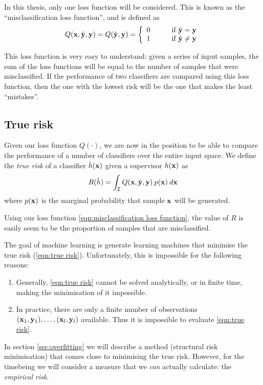 In this thesis, only one loss function will be considered.  This is
known as the ``misclassification loss function'', and is defined as
%
\begin{equation}
Q(\mathbf{x}, \hat{\mathbf{y}}, \mathbf{y}) = Q(\hat{\mathbf{y}}, \mathbf{y}) = \left\{
\begin{array}{ll}
	0	&	\qquad \mbox{if $\hat{\mathbf{y}} = \mathbf{y}$} \\
	1	&	\qquad \mbox{if $\hat{\mathbf{y}} \neq \mathbf{y}$}
\end{array}
\right.
\label{eqn:misclassification loss function}
\end{equation}

This loss function is very easy to understand: given a series of input
samples, the sum of the loss functions will be equal to the number of
samples that were misclassified.  If the performance of two
classifiers are compared using this loss function, then the one with
the lowest risk will be the one that makes the least ``mistakes''.


\subsection{True risk}
\label{sec:true risk}
Given our loss function $Q(\cdot)$, we are now in the position to be
able to compare the performance of a number of classifiers over the
entire input space.  We define the \emph{true risk} of a classifier
$\hat{h}(\mathbf{x})$ given a supervisor $h(\mathbf{x})$ as
%
\begin{equation}
R(\hat{h}) = \int_{\mathcal{I}} Q(\mathbf{x}, \hat{\mathbf{y}}, \mathbf{y}) \: p(\mathbf{x}) \: d\mathbf{x}
\label{eqn:true risk}
\end{equation}
%
where $p(\mathbf{x})$ is the marginal probability that sample $\mathbf{x}$ will be
generated.

Using our loss function \ref{eqn:misclassification loss function}, the
value of $R$ is easily seem to be the proportion of samples that are
misclassified.

The goal of machine learning is generate learning machines that
minimise the true risk (\ref{eqn:true risk}).  Unfortunately, this is
impossible for the following reasons:
%
\begin{enumerate}
\item	Generally, \ref{eqn:true risk} cannot be solved analytically,
	or in finite time, making the minimisation of it impossible.
%
\item	In practice, there are only a finite number of observations
	$(\mathbf{x}_1, \mathbf{y}_1), \ldots, (\mathbf{x}_l, \mathbf{y}_l)$ available.  Thus
	it is impossible to evaluate \ref{eqn:true risk}.
\end{enumerate}
%
In section \ref{sec:overfitting} we will describe a method (structural
risk minimisation) that comes close to minimising the true risk.
However, for the timebeing we will consider a measure that we
\emph{can} actually calculate: the \emph{empirical risk}.


